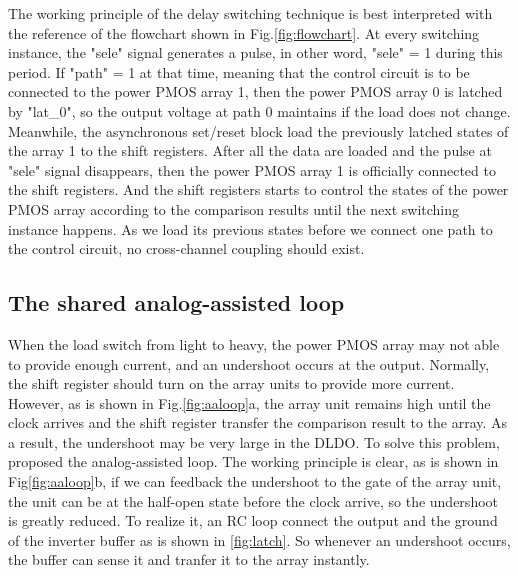 \documentclass[draftcls, journal]{IEEEtran}
\begin{document}
The working principle of the delay switching technique is best interpreted with the reference of the flowchart shown in Fig.\ref{fig:flowchart}. At every switching instance, the "sele" signal generates a pulse, in other word, "sele" = 1 during this period. If "path" = 1 at that time, meaning that the control circuit is to be connected to the power PMOS array 1, then the power PMOS array 0 is latched by "lat\_0", so the output voltage at path 0 maintains if the load does not change. Meanwhile, the asynchronous set/reset block load the previously latched states of the array 1 to the shift registers. After all the data are loaded and the pulse at "sele" signal disappears, then the power PMOS array 1 is officially connected to the shift registers. And the shift registers starts to control the states of the power PMOS array according to the comparison results until the next switching instance happens. As we load its previous states before we connect one path to the control circuit, no cross-channel coupling should exist.

\subsection{The shared analog-assisted loop}
When the load switch from light to heavy, the power PMOS array may not able to provide enough current, and an undershoot occurs at the output. Normally, the shift register should turn on the array units to provide more current. However, as is shown in Fig.\ref{fig:aaloop}a, the array unit remains high until the clock arrives and the shift register transfer the comparison result to the array. As a result, the undershoot may be very large in the DLDO. To solve this problem, \cite{AALDO} proposed the analog-assisted loop. The working principle is clear, as is shown in Fig\ref{fig:aaloop}b, if we can feedback the undershoot to the gate of the array unit, the unit can be at the half-open state before the clock arrive, so the undershoot is greatly reduced. To realize it, an RC loop connect the output and the ground of the inverter buffer as is shown in \ref{fig:latch}. So whenever an undershoot occurs, the buffer can sense it and tranfer it to the array instantly.
\end{document}
